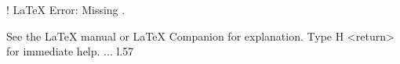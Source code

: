\relax 
! LaTeX Error: Missing .

See the LaTeX manual or LaTeX Companion for explanation.
Type  H <return>  for immediate help. ...                                                                                                l.57                    \providecommand\hyper@newdestlabel[2]{}
